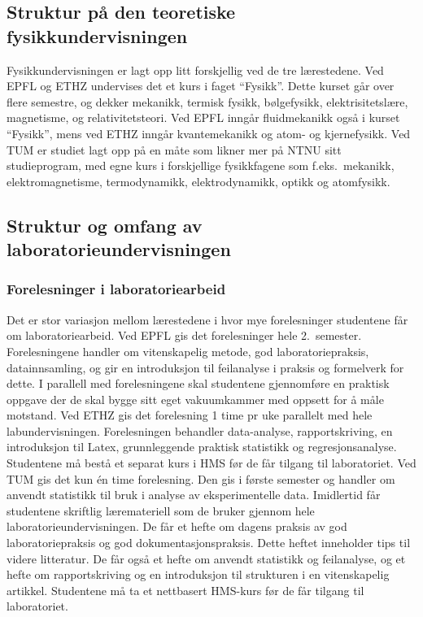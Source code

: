 \documentclass{article}
\begin{document}
\subsection{Struktur på den teoretiske fysikkundervisningen}
Fysikkundervisningen er lagt opp litt forskjellig ved de tre lærestedene. Ved EPFL og ETHZ undervises det et kurs i faget ``Fysikk''. Dette kurset går over flere semestre, og dekker mekanikk, termisk fysikk, bølgefysikk, elektrisitetslære, magnetisme, og relativitetsteori. Ved EPFL inngår fluidmekanikk også i kurset ``Fysikk'', mens ved ETHZ inngår kvantemekanikk og atom- og kjernefysikk. Ved TUM er studiet lagt opp på en måte som likner mer på NTNU sitt studieprogram, med egne kurs i forskjellige fysikkfagene som f.eks.~mekanikk, elektromagnetisme, termodynamikk, elektrodynamikk, optikk og atomfysikk.

\subsection{Struktur og omfang av laboratorieundervisningen}

\subsubsection{Forelesninger i laboratoriearbeid}\label{forel_lab}
Det er stor variasjon mellom lærestedene i hvor mye forelesninger studentene får om laboratoriearbeid.
Ved EPFL gis det forelesninger hele 2.~semester. Forelesningene handler om vitenskapelig metode, god laboratoriepraksis, datainnsamling, og gir en introduksjon til feilanalyse i praksis og formelverk for dette. I parallell med forelesningene skal studentene gjennomføre en praktisk oppgave der de skal bygge sitt eget vakuumkammer med oppsett for å måle motstand.
Ved ETHZ gis det forelesning 1 time pr uke parallelt med hele labundervisningen. Forelesningen behandler data-analyse, rapportskriving, en introduksjon til Latex, grunnleggende praktisk statistikk og regresjonsanalyse. Studentene må bestå et separat kurs i HMS før de får tilgang til laboratoriet.
Ved TUM gis det kun én time forelesning. Den gis i første semester og handler om anvendt statistikk til bruk i analyse av eksperimentelle data. Imidlertid får studentene skriftlig læremateriell som de bruker gjennom hele laboratorieundervisningen. De får et hefte om dagens praksis av god laboratoriepraksis og god dokumentasjonspraksis. Dette heftet inneholder tips til videre litteratur. De får også et hefte om anvendt statistikk og feilanalyse, og et hefte om rapportskriving og en introduksjon til strukturen i en vitenskapelig artikkel. Studentene må ta et nettbasert HMS-kurs før de får tilgang til laboratoriet.
\end{document}
